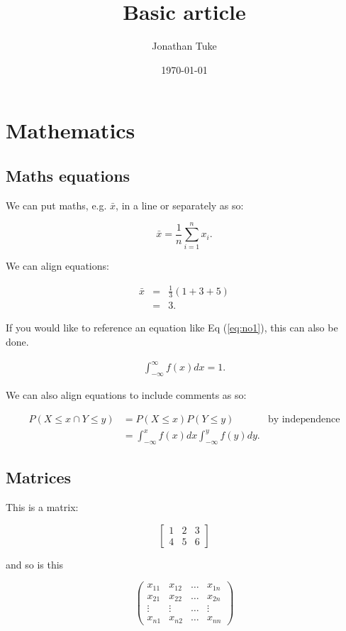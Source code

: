 \documentclass[11pt]{article}
\title{Basic article}
\author{Jonathan Tuke}
\date{\today}
\begin{document}
\maketitle

\tableofcontents

\section{Mathematics}
\subsection{Maths equations}
We can put maths, e.g. $\bar{x}$, in a line or separately as so:

$$
	\bar{x}=\frac{1}{n}\sum^n_{i=1}x_i.
$$

We can align equations:

\begin{eqnarray*}
\bar{x}&=&\frac 13\left(1+3+5\right)\\
&=&3.
\end{eqnarray*}

If you would like to reference an equation like Eq (\ref{eq:no1}), this can also be done.

\begin{eqnarray}
\int^{\infty}_{-\infty}f(x) dx=1.\label{eq:no1}
\end{eqnarray}

We can also align equations to include comments as so:

\begin{align*}
	P(X\leq x \cap Y\leq y)	&= P(X\leq x)P(Y\leq y)&\text{by independence}\\
	&=\int_{-\infty}^{x}f(x)dx \int_{-\infty}^{y}f(y)dy.
\end{align*}

\subsection{Matrices}
This is a matrix:

$$
\begin{bmatrix}
	1&2&3\\
	4&5&6
\end{bmatrix}
$$

and so is this

$$
\begin{pmatrix}
	x_{11} & x_{12} & \ldots & x_{1n}\\
	x_{21} & x_{22} & \ldots & x_{2n}\\
	\vdots & \vdots & \ldots & \vdots\\
	x_{n1} & x_{n2} & \ldots & x_{nn}
\end{pmatrix}
$$
\end{document}
